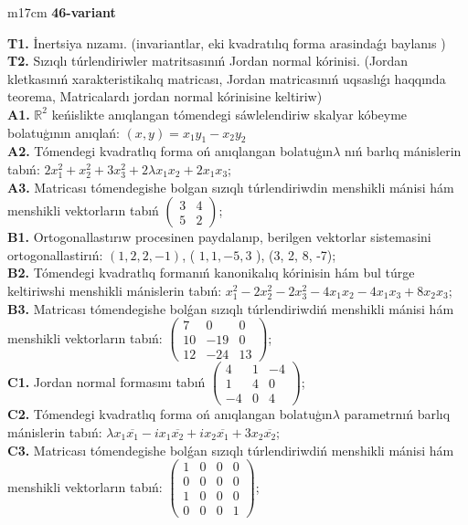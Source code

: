 \documentclass{article}
\begin{document}
\vspace{1cm}


\begin{tabular}{m{17cm}}
\textbf{46-variant}
\newline

\textbf{T1.} İnertsiya nızamı. (invariantlar,  eki kvadratılıq forma arasindaǵı baylanıs ) \\
\textbf{T2.} Sızıqlı túrlendiriwler matritsasınıń Jordan normal kórinisi. (Jordan kletkasınıń xarakteristikalıq matricası, Jordan matricasınıń uqsaslıǵı haqqında teorema,  Matricalardı jordan normal kórinisine keltiriw) \\
\textbf{A1.} \(\mathbb{R}^{2}\) keńislikte anıqlangan tómendegi sáwlelendiriw skalyar kóbeyme bolatuģının anıqlań: \((x,y) = x_{1}y_{1} - x_{2}y_{2}\) \\
\textbf{A2.} Tómendegi kvadratlıq forma oń anıqlangan bolatuģın\(\lambda\) nıń barlıq mánislerin tabıń: \(2x_{1}^{2} + x_{2}^{2} + 3x_{3}^{2} + 2\lambda x_{1}x_{2} + 2x_{1}x_{3}\); \\
\textbf{A3.} Matricası tómendegishe bolgan sızıqlı túrlendiriwdin menshikli mánisi hám menshikli vektorların tabıń \(\begin{pmatrix} 3 & 4 \\ 5 & 2 \end{pmatrix}\); \\
\textbf{B1.} Ortogonallastırıw procesinen paydalanıp, berilgen vektorlar sistemasini ortogonallastirıń: \((1,2,2, - 1)\), ( \(1,1, - 5,3\) ), (3, 2, 8, -7); \\
\textbf{B2.} Tómendegi kvadratlıq formanıń kanonikalıq kórinisin hám bul túrge keltiriwshi menshikli mánislerin tabıń: \(x_{1}^{2} - 2x_{2}^{2} - 2x_{3}^{2} - 4x_{1}x_{2} - 4x_{1}x_{3} + 8x_{2}x_{3}\); \\
\textbf{B3.} Matricası tómendegishe bolǵan sızıqlı túrlendiriwdiń menshikli mánisi hám menshikli vektorların tabıń: \(\begin{pmatrix} 7 & 0 & 0 \\ 10 & - 19 & 0 \\ 12 & - 24 & 13 \end{pmatrix}\); \\
\textbf{C1.} Jordan normal formasını tabıń \(\begin{pmatrix} 4 & 1 & - 4 \\ 1 & 4 & 0 \\  - 4 & 0 & 4 \end{pmatrix}\); \\
\textbf{C2.} Tómendegi kvadratlıq forma oń anıqlangan bolatuģın\(\lambda\) parametrnıń barlıq mánislerin tabıń: \(\lambda x_{1}\overline{x_{1}} - ix_{1}\overline{x_{2}} + ix_{2}\overline{x_{1}} + 3x_{2}\overline{x_{2}}\); \\
\textbf{C3.} Matricası tómendegishe bolǵan sızıqlı túrlendiriwdiń menshikli mánisi hám menshikli vektorların tabıń: \(\begin{pmatrix} 1 & 0 & 0 & 0 \\ 0 & 0 & 0 & 0 \\ 1 & 0 & 0 & 0 \\ 0 & 0 & 0 & 1 \end{pmatrix}\); \\

\end{tabular}
\end{document}
